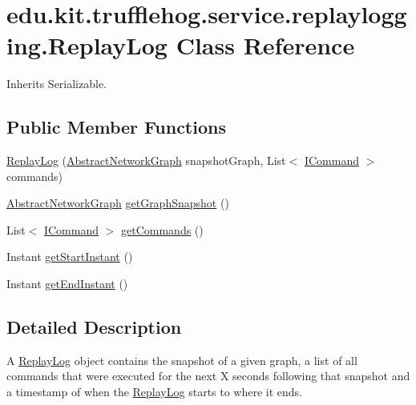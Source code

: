 \hypertarget{classedu_1_1kit_1_1trufflehog_1_1service_1_1replaylogging_1_1_replay_log}{}\section{edu.\+kit.\+trufflehog.\+service.\+replaylogging.\+Replay\+Log Class Reference}
\label{classedu_1_1kit_1_1trufflehog_1_1service_1_1replaylogging_1_1_replay_log}


Inherits Serializable.

\subsection*{Public Member Functions}
\begin{DoxyCompactItemize}
\item 
\hyperlink{classedu_1_1kit_1_1trufflehog_1_1service_1_1replaylogging_1_1_replay_log_a4e64d939395912c270bdb05f40743c4b}{Replay\+Log} (\hyperlink{classedu_1_1kit_1_1trufflehog_1_1model_1_1graph_1_1_abstract_network_graph}{Abstract\+Network\+Graph} snapshot\+Graph, List$<$ \hyperlink{interfaceedu_1_1kit_1_1trufflehog_1_1command_1_1_i_command}{I\+Command} $>$ commands)
\item 
\hyperlink{classedu_1_1kit_1_1trufflehog_1_1model_1_1graph_1_1_abstract_network_graph}{Abstract\+Network\+Graph} \hyperlink{classedu_1_1kit_1_1trufflehog_1_1service_1_1replaylogging_1_1_replay_log_a82562e44dfec3f9ea83d6fcd99d43ae5}{get\+Graph\+Snapshot} ()
\item 
List$<$ \hyperlink{interfaceedu_1_1kit_1_1trufflehog_1_1command_1_1_i_command}{I\+Command} $>$ \hyperlink{classedu_1_1kit_1_1trufflehog_1_1service_1_1replaylogging_1_1_replay_log_a76ef79ab22e3e006d99c6d259973ff3d}{get\+Commands} ()
\item 
Instant \hyperlink{classedu_1_1kit_1_1trufflehog_1_1service_1_1replaylogging_1_1_replay_log_a7d948f6f6c3810c5d80f24d3ce736849}{get\+Start\+Instant} ()
\item 
Instant \hyperlink{classedu_1_1kit_1_1trufflehog_1_1service_1_1replaylogging_1_1_replay_log_a67ddd49d72ce8860d01f56969d1af52a}{get\+End\+Instant} ()
\end{DoxyCompactItemize}


\subsection{Detailed Description}
A \hyperlink{classedu_1_1kit_1_1trufflehog_1_1service_1_1replaylogging_1_1_replay_log}{Replay\+Log} object contains the snapshot of a given graph, a list of all commands that were executed for the next X seconds following that snapshot and a timestamp of when the \hyperlink{classedu_1_1kit_1_1trufflehog_1_1service_1_1replaylogging_1_1_replay_log}{Replay\+Log} starts to where it ends. 

